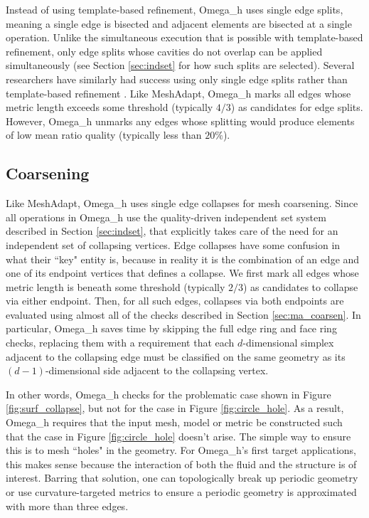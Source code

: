 Instead of using template-based refinement, Omega\_h
uses single edge splits, meaning a single edge is
bisected and adjacent elements are bisected
at a single operation.
Unlike the simultaneous execution that is possible
with template-based refinement, only edge
splits whose cavities do not overlap can be
applied simultaneously (see Section \ref{sec:indset}
for how such splits are selected).
Several researchers have similarly had success
using only single edge splits rather than
template-based refinement
\cite{compere2010mesh,loseille20093d,michal2012anisotropic}.
Like MeshAdapt, Omega\_h marks all edges whose
metric length exceeds some threshold (typically $4/3$) as candidates
for edge splits.
However, Omega\_h unmarks any edges whose splitting
would produce elements of low mean ratio quality (typically less than $20\%$).

\subsection{Coarsening}
\label{sec:osh_coarsen}

Like MeshAdapt, Omega\_h uses single edge collapses
for mesh coarsening.
Since all operations in Omega\_h use the quality-driven
independent set system described in Section \ref{sec:indset},
that explicitly takes care of the need for an independent
set of collapsing vertices.
Edge collapses have some confusion in what their ``key" entity is,
because in reality it is the combination of an edge and one
of its endpoint vertices that defines a collapse.
We first mark all edges whose metric length is beneath
some threshold (typically $2/3$) as candidates to collapse
via either endpoint.
Then, for all such edges, collapses via both endpoints are evaluated
using almost all of the checks described in Section \ref{sec:ma_coarsen}.
In particular, Omega\_h saves time by skipping the full edge ring and face
ring checks, replacing them with a requirement that each $d$-dimensional simplex
adjacent to the collapsing edge must be classified on the same geometry
as its $(d-1)$-dimensional side adjacent to the collapsing vertex.

In other words, Omega\_h checks for the problematic case shown in Figure
\ref{fig:surf_collapse}, but not for the case in Figure \ref{fig:circle_hole}.
As a result, Omega\_h requires that the input mesh, model or metric be
constructed such that the case in Figure \ref{fig:circle_hole} doesn't arise.
The simple way to ensure this is to mesh ``holes" in the geometry.
For Omega\_h's first target applications,
this makes sense because the interaction of both the fluid and the structure
is of interest.
Barring that solution, one can topologically break up periodic geometry
or use curvature-targeted metrics to ensure a periodic geometry is approximated
with more than three edges.

